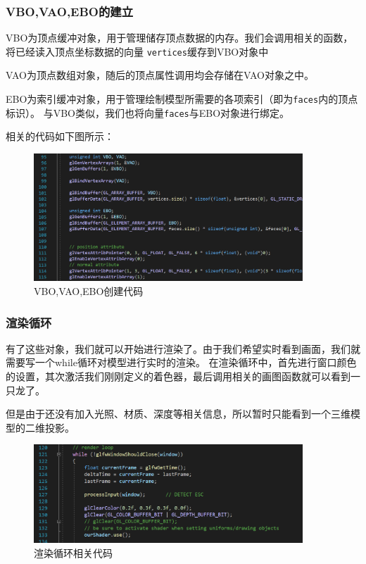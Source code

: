 \documentclass[UTF8]{ctexart}
\begin{document}
\subsubsection{VBO,VAO,EBO的建立}
\par
VBO为顶点缓冲对象，用于管理储存顶点数据的内存。我们会调用相关的函数，将已经读入顶点坐标数据的向量
\verb|vertices|缓存到VBO对象中
\par
VAO为顶点数组对象，随后的顶点属性调用均会存储在VAO对象之中。
\par
EBO为索引缓冲对象，用于管理绘制模型所需要的各项索引（即为\verb|faces|内的顶点标识）。
与VBO类似，我们也将向量\verb|faces|与EBO对象进行绑定。
\par
相关的代码如下图所示：
\begin{figure}[h]
	\centering
	\includegraphics*[width=0.9\textwidth]{2.png}
	\caption{VBO,VAO,EBO创建代码}
	\label{fig:2}
\end{figure}

\subsubsection{渲染循环}
\par
有了这些对象，我们就可以开始进行渲染了。由于我们希望实时看到画面，我们就需要写一个while循环对模型进行实时的渲染。
在渲染循环中，首先进行窗口颜色的设置，其次激活我们刚刚定义的着色器，最后调用相关的画图函数就可以看到一只龙了。
\par
但是由于还没有加入光照、材质、深度等相关信息，所以暂时只能看到一个三维模型的二维投影。

\begin{figure}[h]
	\centering
	\includegraphics*[width=0.9\textwidth]{3.png}
	\caption{渲染循环相关代码}
	\label{fig:3}
\end{figure}
\end{document}
